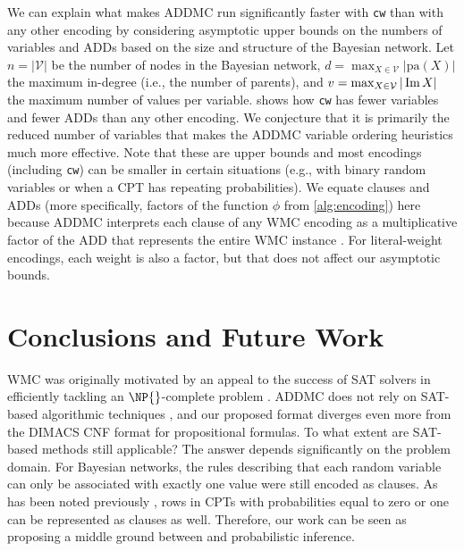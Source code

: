 We can explain what makes \textsc{ADDMC} \citep{DBLP:conf/aaai/DudekPV20} run
significantly faster with \texttt{cw} than with any other encoding by
considering asymptotic upper bounds on the numbers of variables and ADDs based
on the size and structure of the Bayesian network. Let $n = |\mathcal{V}|$ be
the number of nodes in the Bayesian network,
$d = \max_{X \in \mathcal{V}} |\mathrm{pa}(X)|$ the maximum in-degree (i.e., the
number of parents), and $v = \max_{X \in \mathcal{V}} |\operatorname{Im} X|$ the maximum
number of values per variable.  shows how \texttt{cw} has
fewer variables and fewer ADDs than any other encoding. We conjecture that it is
primarily the reduced number of variables that makes the \textsc{ADDMC} variable
ordering heuristics much more effective. Note that these are upper bounds and
most encodings (including \texttt{cw}) can be smaller in certain situations
(e.g., with binary random variables or when a CPT has repeating probabilities).
We equate clauses and ADDs (more specifically, factors of the function $\phi$
from \cref{alg:encoding}) here because \textsc{ADDMC} interprets each clause of
any WMC encoding as a multiplicative factor of the ADD that represents the
entire WMC instance \citep{DBLP:conf/aaai/DudekPV20}. For literal-weight
encodings, each weight is also a factor, but that does not affect our asymptotic
bounds.

\section{Conclusions and Future Work}

WMC was originally motivated by an appeal to the success of SAT solvers in
efficiently tackling an $\NP{}$-complete problem
\citep{DBLP:conf/aaai/SangBK05}. \textsc{ADDMC} does not rely on SAT-based
algorithmic techniques \citep{DBLP:conf/aaai/DudekPV20}, and our proposed format
diverges even more from the DIMACS CNF format for propositional formulas. To
what extent are SAT-based methods still applicable? The answer depends
significantly on the problem domain. For Bayesian networks, the rules describing
that each random variable can only be associated with exactly one value were
still encoded as clauses. As has been noted previously
\citep{DBLP:conf/sat/ChaviraD06}, rows in CPTs with probabilities equal to zero
or one can be represented as clauses as well. Therefore, our work can be seen as
proposing a middle ground between \mc{} and probabilistic inference.

